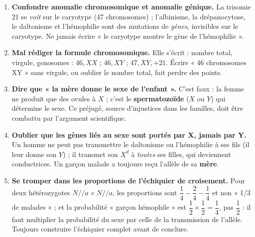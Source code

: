 \documentclass[11pt]{article}
\begin{document}
\begin{attention}
\begin{enumerate}
\item \textbf{Confondre anomalie chromosomique et anomalie génique.} La trisomie 21 se \emph{voit} sur le caryotype (47 chromosomes) ; l'albinisme, la drépanocytose, le daltonisme et l'hémophilie sont des mutations de \emph{gènes}, invisibles sur le caryotype. Ne jamais écrire « le caryotype montre le gène de l'hémophilie ».
\item \textbf{Mal rédiger la formule chromosomique.} Elle s'écrit : nombre total, virgule, gonosomes : $46, XX$ ; $46, XY$ ; $47, XY, +21$. Écrire « 46 chromosomes XY » sans virgule, ou oublier le nombre total, fait perdre des points.
\item \textbf{Dire que « la mère donne le sexe de l'enfant ».} C'est faux : la femme ne produit que des ovules à $X$ ; c'est le \textbf{spermatozoïde} ($X$ ou $Y$) qui détermine le sexe. Ce préjugé, source d'injustices dans les familles, doit être combattu par l'argument scientifique.
\item \textbf{Oublier que les gènes liés au sexe sont portés par X, jamais par Y.} Un homme ne peut pas transmettre le daltonisme ou l'hémophilie à ses fils (il leur donne son $Y$) ; il transmet son $X^d$ à \emph{toutes} ses filles, qui deviennent conductrices. Un garçon malade a toujours reçu l'allèle de sa \textbf{mère}.
\item \textbf{Se tromper dans les proportions de l'échiquier de croisement.} Pour deux hétérozygotes $N/\!/a \times N/\!/a$, les proportions sont $\dfrac{1}{4} - \dfrac{2}{4} - \dfrac{1}{4}$ et non « 1/3 de malades » ; et la probabilité « garçon hémophile » est $\dfrac{1}{2} \times \dfrac{1}{2} = \dfrac{1}{4}$, pas $\dfrac{1}{2}$ : il faut multiplier la probabilité du sexe par celle de la transmission de l'allèle. Toujours construire l'échiquier complet avant de conclure.
\end{enumerate}
\end{attention}
\end{document}
